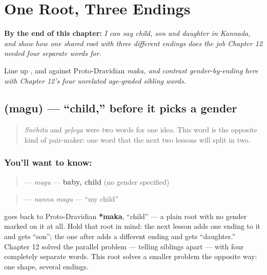 
\chapter{One Root, Three Endings}
\label{ch:ka-child-son-daughter}

\begin{chapteropening}
\textbf{By the end of this chapter:} \emph{I can say child, son and daughter in Kannada, and show how one shared root with three different endings does the job Chapter 12 needed four separate words for.}

Line up ,  and  against Proto-Dravidian \emph{maka, and contrast gender-by-ending here with Chapter 12's four unrelated age-graded sibling words.}
\end{chapteropening}

\section[\texorpdfstring{\kn{ಮಗು} (magu)}{ಮಗು (magu)}]{ (magu) — \textquotedblleft{}child,\textquotedblright{} before it picks a gender}

\label{lesson:KA-C36-magu}



\begin{quote}
\emph{Snēhita} and \emph{geḷeya} were two words for one idea. This word is the opposite kind of pair-maker: one word that the next two lessons will split in two.
\end{quote}

\subsection*{You'll want to know: }
\begin{quote}
\textbf{} — \emph{magu} — \textbf{baby, child} (no gender specified)
\end{quote}

\begin{quote}
\textbf{ } — \emph{nanna magu} — \textquotedblleft{}my child\textquotedblright{}
\end{quote}

\begin{cousinweb}
\textbf{} goes back to Proto-Dravidian \textbf{*maka}, \textquotedblleft{}child\textquotedblright{} — a plain root with no gender marked on it at all. Hold that root in mind: the next lesson adds one ending to it and gets \textquotedblleft{}son\textquotedblright{}; the one after adds a different ending and gets \textquotedblleft{}daughter.\textquotedblright{} Chapter 12 solved the parallel problem — telling siblings apart — with four completely separate words. This root solves a smaller problem the opposite way: one shape, several endings.
\end{cousinweb}

